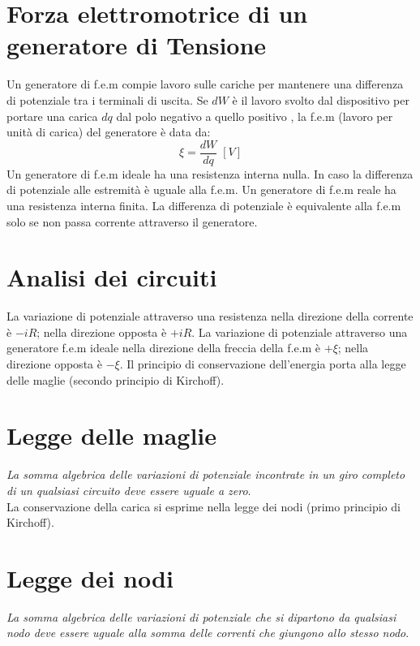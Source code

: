     \section{Forza elettromotrice di un generatore di Tensione} Un generatore
    di f.e.m compie lavoro sulle cariche per mantenere una differenza di 
    potenziale tra i terminali di uscita. Se $dW$ è il lavoro svolto dal 
    dispositivo per portare una carica $dq$ dal polo negativo a quello positivo
    , la f.e.m (lavoro per unità di carica) del generatore è data da:
        \begin{equation}
            \xi = \frac{dW}{dq} \; [V]   
        \end{equation}
    Un generatore di f.e.m ideale ha una resistenza interna nulla. In caso la
    differenza di potenziale alle estremità è uguale alla f.e.m. Un generatore
    di f.e.m reale ha una resistenza interna finita. La differenza di 
    potenziale è equivalente alla f.e.m solo se non passa corrente attraverso 
    il generatore.

    \section{Analisi dei circuiti} La variazione di potenziale attraverso una 
    resistenza nella direzione della corrente è $-iR$; nella direzione opposta
    è $+iR$. La variazione di potenziale attraverso una generatore f.e.m ideale
    nella direzione della freccia della f.e.m è $+\xi$; nella direzione opposta
    è $-\xi$. Il principio di conservazione dell'energia porta alla legge delle
    maglie (secondo principio di Kirchoff).

    \section{Legge delle maglie} \textit{La somma algebrica delle variazioni di
    potenziale incontrate in un giro completo di un qualsiasi circuito deve 
    essere uguale a zero}.\\
    La conservazione della carica si esprime nella legge dei nodi (primo 
    principio di Kirchoff).

    \section{Legge dei nodi} \textit{La somma algebrica delle variazioni di 
    potenziale che si dipartono da qualsiasi nodo deve essere uguale alla somma
    delle correnti che giungono allo stesso nodo}.

